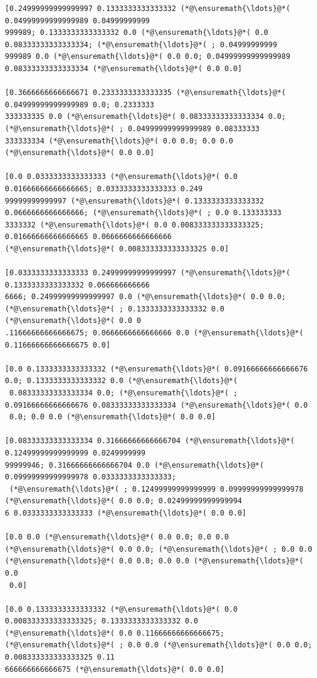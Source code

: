 \documentclass[12pt,a4paper]{article}
\begin{document}
\begin{lstlisting}
[0.24999999999999997 0.1333333333333332 (*@\ensuremath{\ldots}@*( 0.04999999999999989 0.04999999999
999989; 0.1333333333333332 0.0 (*@\ensuremath{\ldots}@*( 0.0 0.08333333333333334; (*@\ensuremath{\ldots}@*( ; 0.04999999999
999989 0.0 (*@\ensuremath{\ldots}@*( 0.0 0.0; 0.04999999999999989 0.08333333333333334 (*@\ensuremath{\ldots}@*( 0.0 0.0]

[0.3666666666666671 0.2333333333333335 (*@\ensuremath{\ldots}@*( 0.04999999999999989 0.0; 0.2333333
333333335 0.0 (*@\ensuremath{\ldots}@*( 0.08333333333333334 0.0; (*@\ensuremath{\ldots}@*( ; 0.04999999999999989 0.08333333
333333334 (*@\ensuremath{\ldots}@*( 0.0 0.0; 0.0 0.0 (*@\ensuremath{\ldots}@*( 0.0 0.0]

[0.0 0.0333333333333333 (*@\ensuremath{\ldots}@*( 0.0 0.01666666666666665; 0.0333333333333333 0.249
99999999999997 (*@\ensuremath{\ldots}@*( 0.1333333333333332 0.0666666666666666; (*@\ensuremath{\ldots}@*( ; 0.0 0.133333333
3333332 (*@\ensuremath{\ldots}@*( 0.0 0.008333333333333325; 0.01666666666666665 0.0666666666666666 
(*@\ensuremath{\ldots}@*( 0.008333333333333325 0.0]

[0.0333333333333333 0.24999999999999997 (*@\ensuremath{\ldots}@*( 0.1333333333333332 0.066666666666
6666; 0.24999999999999997 0.0 (*@\ensuremath{\ldots}@*( 0.0 0.0; (*@\ensuremath{\ldots}@*( ; 0.1333333333333332 0.0 (*@\ensuremath{\ldots}@*( 0.0 0
.11666666666666675; 0.0666666666666666 0.0 (*@\ensuremath{\ldots}@*( 0.11666666666666675 0.0]

[0.0 0.1333333333333332 (*@\ensuremath{\ldots}@*( 0.09166666666666676 0.0; 0.1333333333333332 0.0 (*@\ensuremath{\ldots}@*(
 0.08333333333333334 0.0; (*@\ensuremath{\ldots}@*( ; 0.09166666666666676 0.08333333333333334 (*@\ensuremath{\ldots}@*( 0.0
 0.0; 0.0 0.0 (*@\ensuremath{\ldots}@*( 0.0 0.0]

[0.08333333333333334 0.31666666666666704 (*@\ensuremath{\ldots}@*( 0.12499999999999999 0.0249999999
99999946; 0.31666666666666704 0.0 (*@\ensuremath{\ldots}@*( 0.09999999999999978 0.0333333333333333;
 (*@\ensuremath{\ldots}@*( ; 0.12499999999999999 0.09999999999999978 (*@\ensuremath{\ldots}@*( 0.0 0.0; 0.02499999999999994
6 0.0333333333333333 (*@\ensuremath{\ldots}@*( 0.0 0.0]

[0.0 0.0 (*@\ensuremath{\ldots}@*( 0.0 0.0; 0.0 0.0 (*@\ensuremath{\ldots}@*( 0.0 0.0; (*@\ensuremath{\ldots}@*( ; 0.0 0.0 (*@\ensuremath{\ldots}@*( 0.0 0.0; 0.0 0.0 (*@\ensuremath{\ldots}@*( 0.0
 0.0]

[0.0 0.1333333333333332 (*@\ensuremath{\ldots}@*( 0.0 0.008333333333333325; 0.1333333333333332 0.0 
(*@\ensuremath{\ldots}@*( 0.0 0.11666666666666675; (*@\ensuremath{\ldots}@*( ; 0.0 0.0 (*@\ensuremath{\ldots}@*( 0.0 0.0; 0.008333333333333325 0.11
666666666666675 (*@\ensuremath{\ldots}@*( 0.0 0.0]


\end{lstlisting}
\end{document}
